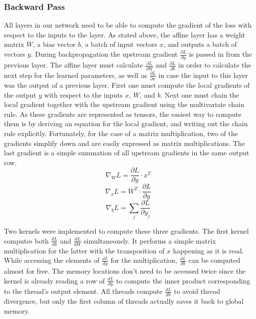 \documentclass[conference]{IEEEtran}
\begin{document}
\subsubsection{Backward Pass}
All layers in our network need to be able to compute the gradient of the loss with respect to the inputs to the layer. As stated above, the affine layer has a weight matrix $W$, a bias vector $b$, a batch of input vectors $x$, and outputs a batch of vectors $y$. During backpropagation the upstream gradient $\frac{\partial L}{\partial y}$ is passed in from the previous layer. The affine layer must calculate $\frac{\partial L}{\partial W}$ and $\frac{\partial L}{\partial b}$ in order to calculate the next step for the learned parameters, as well as $\frac{\partial L}{\partial x}$ in case the input to this layer was the output of a previous layer. First one must compute the local gradients of the output $y$ with respect to the inputs $x$, $W$, and $b$. Next one must chain the local gradient together with the upstream gradient using the multivariate chain rule. As these gradients are represented as tensors, the easiest way to compute them is by deriving an equation for the local gradient, and writing out the chain rule explicitly. Fortunately, for the case of a matrix multiplication, two of the gradients simplify down and are easily expressed as matrix multiplications. The last gradient is a simple summation of all upstream gradients in the same output row. 
\begin{equation} \label{eq:dLdW}
\nabla_W L = \frac{\partial L}{\partial y} \cdot x^T
\end{equation}
\begin{equation} \label{eq:dLdx}
\nabla_x L = W^T \cdot \frac{\partial L}{\partial y} 
\end{equation}
\begin{equation} \label{eq:dLdb}
\nabla_b L = \sum_{j}\frac{\partial L}{\partial y_j}
\end{equation}

Two kernels were implemented to compute these three gradients. The first kernel computes both $\frac{dL}{db}$ and $\frac{dL}{dW}$ simultaneously. It performs a simple matrix multiplication for the latter with the transposition of $x$ happening as it is read. While accessing the elements of $\frac{dL}{dy}$ for the multiplication, $\frac{dL}{db}$ can be computed almost for free. The memory locations don't need to be accessed twice since the kernel is already reading a row of $\frac{dL}{dy}$ to compute the inner product corresponding to the thread's output element. All threads compute $\frac{dL}{db}$ to avoid thread divergence, but only the first column of threads actually saves it back to global memory.
\end{document}
